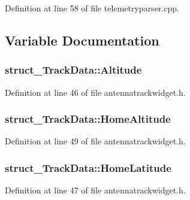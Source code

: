 Definition at line 58 of file telemetryparser.\-cpp.



\subsection{Variable Documentation}
\hypertarget{group___antenna_track_gadget_plugin_ga528ec049631eed362529f9ea5fd30b99}{
\subsubsection[{Altitude}]{ struct\-\_\-\-Track\-Data\-::\-Altitude}}\label{group___antenna_track_gadget_plugin_ga528ec049631eed362529f9ea5fd30b99}


Definition at line 46 of file antennatrackwidget.\-h.

\hypertarget{group___antenna_track_gadget_plugin_ga0bb6374ee3a9a6f864fbd03a1c791256}{
\subsubsection[{Home\-Altitude}]{ struct\-\_\-\-Track\-Data\-::\-Home\-Altitude}}\label{group___antenna_track_gadget_plugin_ga0bb6374ee3a9a6f864fbd03a1c791256}


Definition at line 49 of file antennatrackwidget.\-h.

\hypertarget{group___antenna_track_gadget_plugin_gad25500d6984ee3227abe9b2663c0a975}{
\subsubsection[{Home\-Latitude}]{ struct\-\_\-\-Track\-Data\-::\-Home\-Latitude}}\label{group___antenna_track_gadget_plugin_gad25500d6984ee3227abe9b2663c0a975}


Definition at line 47 of file antennatrackwidget.\-h.

